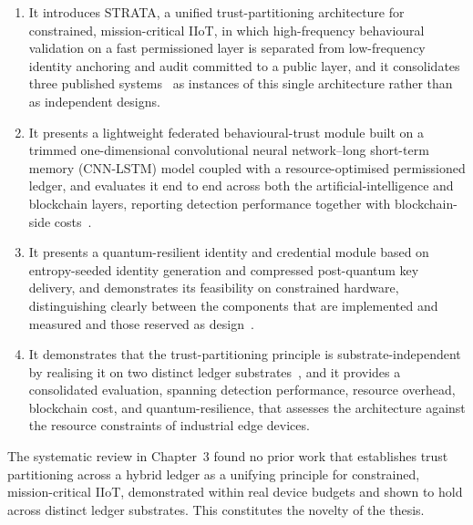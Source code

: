 \begin{enumerate}
  \item It introduces STRATA, a unified trust-partitioning architecture for
        constrained, mission-critical IIoT, in which high-frequency behavioural
        validation on a fast permissioned layer is separated from low-frequency
        identity anchoring and audit committed to a public layer, and it
        consolidates three published
        systems~\cite{amadi2026lightweight, amadi2025quantum, amadi2026symmetric}
        as instances of this single architecture rather than as independent
        designs.

  \item It presents a lightweight federated behavioural-trust module built on a
        trimmed one-dimensional convolutional neural network--long short-term
        memory (CNN-LSTM) model coupled with a resource-optimised
        permissioned ledger, and evaluates it end to end across both the
        artificial-intelligence and blockchain layers, reporting detection
        performance together with blockchain-side
        costs~\cite{amadi2026lightweight}.

  \item It presents a quantum-resilient identity and credential module based on
        entropy-seeded identity generation and compressed post-quantum key
        delivery, and demonstrates its feasibility on constrained hardware,
        distinguishing clearly between the components that are implemented and
        measured and those reserved as design~\cite{amadi2025quantum}.

  \item It demonstrates that the trust-partitioning principle is
        substrate-independent by realising it on two distinct ledger
        substrates~\cite{amadi2026lightweight, amadi2026symmetric}, and it provides a consolidated evaluation, spanning
        detection performance, resource overhead, blockchain cost, and
        quantum-resilience, that assesses the architecture against the resource
        constraints of industrial edge devices.
\end{enumerate}

The systematic review in Chapter~3 found no prior work that establishes trust
partitioning across a hybrid ledger as a unifying principle for constrained,
mission-critical IIoT, demonstrated within real device budgets and shown to hold
across distinct ledger substrates. This constitutes the novelty of the thesis.

